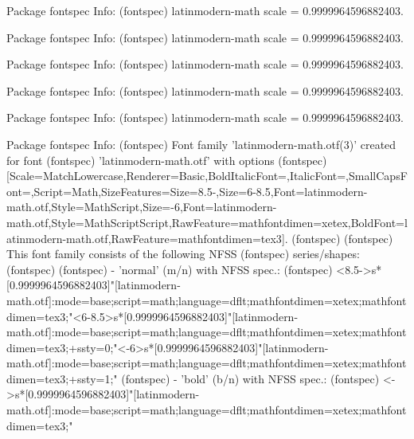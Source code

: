 Package fontspec Info: 
(fontspec)             latinmodern-math scale = 0.9999964596882403.


Package fontspec Info: 
(fontspec)             latinmodern-math scale = 0.9999964596882403.


Package fontspec Info: 
(fontspec)             latinmodern-math scale = 0.9999964596882403.


Package fontspec Info: 
(fontspec)             latinmodern-math scale = 0.9999964596882403.


Package fontspec Info: 
(fontspec)             latinmodern-math scale = 0.9999964596882403.


Package fontspec Info: 
(fontspec)             Font family 'latinmodern-math.otf(3)' created for font
(fontspec)             'latinmodern-math.otf' with options
(fontspec)             [Scale=MatchLowercase,Renderer=Basic,BoldItalicFont={},ItalicFont={},SmallCapsFont={},Script=Math,SizeFeatures={{Size=8.5-},{Size=6-8.5,Font=latinmodern-math.otf,Style=MathScript},{Size=-6,Font=latinmodern-math.otf,Style=MathScriptScript}},RawFeature={mathfontdimen=xetex},BoldFont={latinmodern-math.otf},RawFeature={mathfontdimen=tex3}].
(fontspec)              
(fontspec)              This font family consists of the following NFSS
(fontspec)             series/shapes:
(fontspec)              
(fontspec)             - 'normal' (m/n) with NFSS spec.:
(fontspec)             <8.5->s*[0.9999964596882403]"[latinmodern-math.otf]:mode=base;script=math;language=dflt;mathfontdimen=xetex;mathfontdimen=tex3;"<6-8.5>s*[0.9999964596882403]"[latinmodern-math.otf]:mode=base;script=math;language=dflt;mathfontdimen=xetex;mathfontdimen=tex3;+ssty=0;"<-6>s*[0.9999964596882403]"[latinmodern-math.otf]:mode=base;script=math;language=dflt;mathfontdimen=xetex;mathfontdimen=tex3;+ssty=1;"
(fontspec)             - 'bold' (b/n) with NFSS spec.:
(fontspec)             <->s*[0.9999964596882403]"[latinmodern-math.otf]:mode=base;script=math;language=dflt;mathfontdimen=xetex;mathfontdimen=tex3;"

